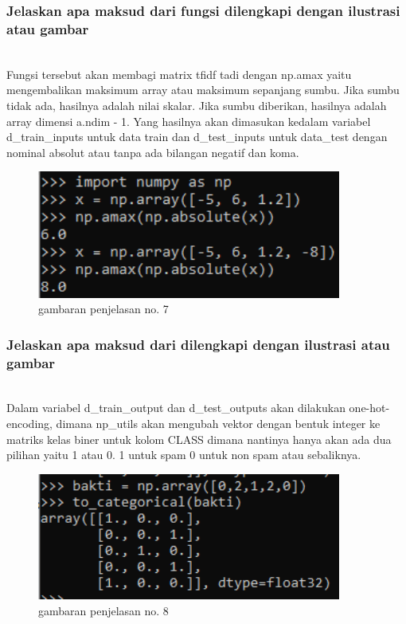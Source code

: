 \subsubsection{Jelaskan apa maksud dari fungsi dilengkapi dengan ilustrasi atau gambar}
\hfill\\
Fungsi tersebut akan membagi matrix tfidf tadi dengan np.amax yaitu mengembalikan maksimum array atau maksimum sepanjang sumbu. Jika sumbu tidak ada, hasilnya adalah nilai skalar. Jika sumbu diberikan, hasilnya adalah array dimensi a.ndim - 1. Yang hasilnya akan dimasukan kedalam variabel d\_train\_inputs untuk data train dan d\_test\_inputs untuk data\_test dengan nominal absolut atau tanpa ada bilangan negatif dan koma.
\begin{figure}[H]
	\centering
	\includegraphics[width=10cm]{figures/1174083/figures7/6.png}
	\caption{gambaran penjelasan no. 7}
\end{figure}

\subsubsection{Jelaskan apa maksud dari  dilengkapi dengan ilustrasi atau gambar}
\hfill\\
Dalam variabel d\_train\_output dan d\_test\_outputs akan dilakukan one-hot-encoding, dimana np\_utils akan mengubah vektor dengan bentuk integer ke matriks kelas biner untuk kolom CLASS dimana nantinya hanya akan ada dua pilihan yaitu 1 atau 0. 1 untuk spam 0 untuk non spam atau sebaliknya.
\begin{figure}[H]
	\centering
	\includegraphics[width=10cm]{figures/1174083/figures7/7.png}
	\caption{gambaran penjelasan no. 8}
\end{figure}

